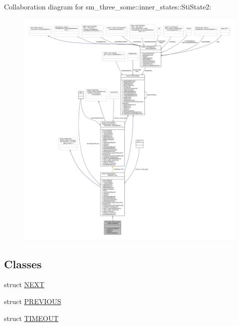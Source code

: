 Collaboration diagram for sm\+\_\+three\+\_\+some\+:\+:inner\+\_\+states\+:\+:Sti\+State2\+:
\nopagebreak
\begin{figure}[H]
\begin{center}
\leavevmode
\includegraphics[width=350pt]{structsm__three__some_1_1inner__states_1_1StiState2__coll__graph}
\end{center}
\end{figure}
\subsection*{Classes}
\begin{DoxyCompactItemize}
\item 
struct \hyperlink{structsm__three__some_1_1inner__states_1_1StiState2_1_1NEXT}{N\+E\+XT}
\item 
struct \hyperlink{structsm__three__some_1_1inner__states_1_1StiState2_1_1PREVIOUS}{P\+R\+E\+V\+I\+O\+US}
\item 
struct \hyperlink{structsm__three__some_1_1inner__states_1_1StiState2_1_1TIMEOUT}{T\+I\+M\+E\+O\+UT}
\end{DoxyCompactItemize}

